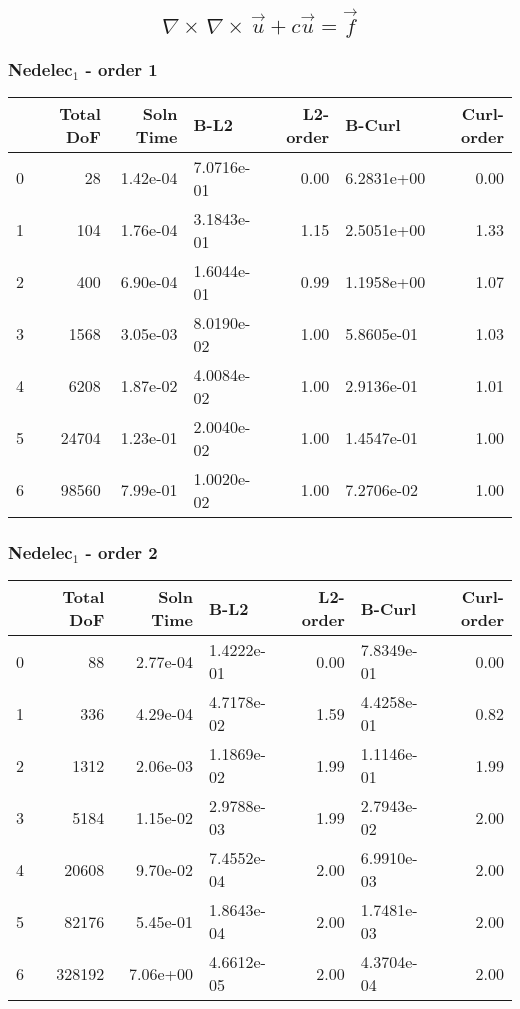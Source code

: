 \documentclass[12pt]{extarticle}
\numberwithin{equation}{section}    %
\newcommand{\curl}{\ensuremath{\nabla \times\,}}
\renewcommand{\u}{\vec u}
\newcommand{\f}{\vec f}
\begin{document}
\pagestyle{fancyplain}
\fancyhead{}
\fancyfoot{} %
\fancyfoot[LE,RO]{\thepage \hspace{-5mm}}
\fancyfoot[CO,RE]{}

\subsection*{$$\curl \curl \u +c\u = \f$$}

\subsubsection*{Nedelec$_1$ - order 1}

\begin{tabular}{lrrlrlr}
\hline
{} &  Total DoF &  Soln Time &        B-L2 &  L2-order &      B-Curl &  Curl-order \\
\hline
0 &         28 &   1.42e-04 &  7.0716e-01 &     0.00 &  6.2831e+00 &        0.00 \\
1 &        104 &   1.76e-04 &  3.1843e-01 &     1.15 &  2.5051e+00 &        1.33 \\
2 &        400 &   6.90e-04 &  1.6044e-01 &     0.99 &  1.1958e+00 &        1.07 \\
3 &       1568 &   3.05e-03 &  8.0190e-02 &     1.00 &  5.8605e-01 &        1.03 \\
4 &       6208 &   1.87e-02 &  4.0084e-02 &     1.00 &  2.9136e-01 &        1.01 \\
5 &      24704 &   1.23e-01 &  2.0040e-02 &     1.00 &  1.4547e-01 &        1.00 \\
6 &      98560 &   7.99e-01 &  1.0020e-02 &     1.00 &  7.2706e-02 &        1.00 \\
\hline
\end{tabular}


\subsubsection*{Nedelec$_1$ - order 2}


\begin{tabular}{lrrlrlr}
\hline
{} &  Total DoF &  Soln Time &        B-L2 &  L2-order &      B-Curl &  Curl-order \\
\hline
0 &         88 &   2.77e-04 &  1.4222e-01 &     0.00 &  7.8349e-01 &        0.00 \\
1 &        336 &   4.29e-04 &  4.7178e-02 &     1.59 &  4.4258e-01 &        0.82 \\
2 &       1312 &   2.06e-03 &  1.1869e-02 &     1.99 &  1.1146e-01 &        1.99 \\
3 &       5184 &   1.15e-02 &  2.9788e-03 &     1.99 &  2.7943e-02 &        2.00 \\
4 &      20608 &   9.70e-02 &  7.4552e-04 &     2.00 &  6.9910e-03 &        2.00 \\
5 &      82176 &   5.45e-01 &  1.8643e-04 &     2.00 &  1.7481e-03 &        2.00 \\
6 &     328192 &   7.06e+00 &  4.6612e-05 &     2.00 &  4.3704e-04 &        2.00 \\
\hline
\end{tabular}
\end{document}
